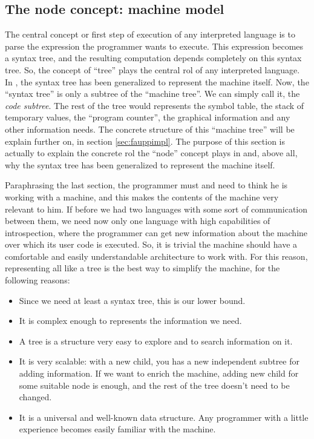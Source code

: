 \documentclass{article}
\begin{document}
\subsection{The node concept: machine model}
The central concept or first step of execution of any interpreted language is to
parse the expression the programmer wants to execute. This expression becomes a
syntax tree, and the resulting computation depends completely on this syntax
tree. So, the concept of ``tree'' plays the central rol of any interpreted
language. In \fav, the syntax tree has been generalized to represent the machine
itself. Now, the ``syntax tree'' is only a subtree of the ``machine tree''. We
can simply call it, the \textit{code subtree}. The rest of the tree would
represents the symbol table, the stack of temporary values, the ``program
counter'', the graphical information and any other information \fav needs. The
concrete structure of this ``machine tree'' will be explain further on, in
section \ref{sec:fauppimpl}. The purpose of this section is actually to explain
the concrete rol the ``node'' concept plays in \fav and, above all, why the
syntax tree has been generalized to represent the machine itself.

Paraphrasing the last section, the programmer must and need to think he is
working with a machine, and this makes the contents of the machine very relevant
to him. If before we had two languages with some sort of communication between
them, we need now only one language with high capabilities of introspection,
where the programmer can get new information about the machine over which its
user code is executed. So, it is trivial the machine should have a comfortable
and easily understandable architecture to work with. For this reason,
representing all like a tree is the best way to simplify the machine, for the
following reasons:

\begin{itemize}
\item Since we need at least a syntax tree, this is our lower bound.
\item It is complex enough to represents the information we need.
\item A tree is a structure very easy to explore and to search information on it.
\item It is very scalable: with a new child, you has a new independent subtree
  for adding information. If we want to enrich the machine, adding new child for
  some suitable node is enough, and the rest of the tree doesn't need to be
  changed.
\item It is a universal and well-known data structure. Any programmer with a
  little experience becomes easily familiar with the machine.
\end{itemize}
\end{document}
